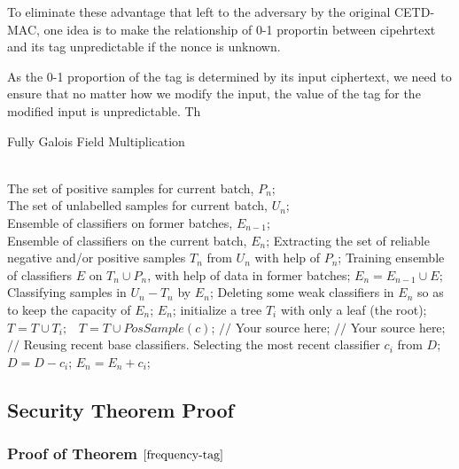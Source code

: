 \documentclass{article}
\begin{document}
To eliminate these advantage that left to the adversary by the original CETD-MAC, one idea is to make the relationship of 0-1 proportin between cipehrtext and its tag unpredictable if the nonce is unknown. 

As the 0-1 proportion of the tag is determined by its input ciphertext, we need to ensure that no matter how we modify the input, the value of the tag for the modified input is unpredictable. Th 

\renewcommand{\algorithmicrequire}{ \textbf{Input:}} %
\renewcommand{\algorithmicensure}{ \textbf{Output:}} %
\begin{algorithm}[htb] 
\caption{Fully Galois Field Multiplication} 
\label{alg:fully-GFM} 
\begin{algorithmic}[1] %
\REQUIRE ~~\\ %
The set of positive samples for current batch, $P_n$;\\
The set of unlabelled samples for current batch, $U_n$;\\
Ensemble of classifiers on former batches, $E_{n-1}$;
\ENSURE ~~\\ %
Ensemble of classifiers on the current batch, $E_n$;
\STATE Extracting the set of reliable negative and/or positive samples $T_n$ from $U_n$ with help of $P_n$; 
\label{ code:fram:extract }%
\STATE Training ensemble of classifiers $E$ on $T_n \cup P_n$, with help of data in former batches; 
\label{code:fram:trainbase}
\STATE $E_n=E_{n-1}\cup E$; 
\label{code:fram:add}
\STATE Classifying samples in $U_n-T_n$ by $E_n$; 
\label{code:fram:classify}
\STATE Deleting some weak classifiers in $E_n$ so as to keep the capacity of $E_n$; 
\label{code:fram:select}
\RETURN $E_n$; %
\STATE initialize a tree $T_{i}$ with only a leaf (the root);\
\STATE $T=T \cup T_{i};$\
\ENDFOR
{} 
\label{code:TrainBase:getc}
\STATE $T=T \cup PosSample(c)$; 
\label{code:TrainBase:pos}
\ENDFOR
{}
\STATE $//$ Your source here;
\ENDFOR
{}
\STATE $//$ Your source here;
\ENDFOR
\STATE $//$ Reusing recent base classifiers. 
\label{code:recentStart}
\WHILE {$(|E_n| \leq L_1 )and( D \neq \phi)$}
\STATE Selecting the most recent classifier $c_i$ from $D$;
\STATE $D=D-c_i$;
\STATE $E_n=E_n+c_i$;
\ENDWHILE 
\label{code:recentEnd}
\end{algorithmic}
\end{algorithm}


\appendix
\subsection{Security Theorem Proof}
\subsubsection{Proof of Theorem $\ref{frequency-tag}$}
\end{document}
